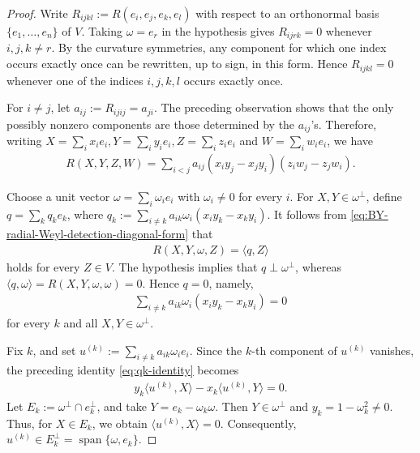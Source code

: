 \documentclass[10pt]{amsart}
\theoremstyle{plain}
\theoremstyle{remark}
\begin{document}
	\begin{proof}
		Write $R_{ijkl}:=R(e_i,e_j,e_k,e_l)$ with respect to an orthonormal
		basis $\{e_1,\ldots,e_n\}$ of $V$. Taking $\omega=e_r$ in the
		hypothesis gives $R_{ijrk}=0$ whenever $i,j,k\neq r$. By the curvature
		symmetries, any component for which one index occurs exactly once can
		be rewritten, up to sign, in this form. Hence $R_{ijkl}=0$ whenever
		one of the indices $i,j,k,l$ occurs exactly once.
		
		For $i\neq j$, let $a_{ij}:=R_{ijij}=a_{ji}$. The preceding observation
		shows that the only possibly nonzero components are those determined by
		the $a_{ij}$'s. Therefore, writing $X=\sum_i x_i e_i,Y=\sum_i y_i e_i,Z=\sum_i z_i e_i$ and $W=\sum_i w_i e_i$, we have
		\begin{align}
			\label{eq:BY-radial-Weyl-detection-diagonal-form}
			R(X,Y,Z,W)
			=
			\sum_{i<j}
			a_{ij}
			(x_i y_j-x_j y_i)
			(z_i w_j-z_j w_i).
		\end{align}
		
		Choose a unit vector $\omega=\sum_i\omega_i e_i$ with $\omega_i\neq0$
		for every $i$. For $X,Y\in\omega^\perp$, define
		$q=\sum_k q_k e_k$, where $q_k:=\sum_{i\neq k}a_{ik}\omega_i(x_i y_k-x_k y_i)$. It follows from
		\eqref{eq:BY-radial-Weyl-detection-diagonal-form} that
		\begin{align*}
			R(X,Y,\omega,Z)=\langle q,Z\rangle
		\end{align*}
		holds for every $Z\in V$. The hypothesis
		implies that $q\perp\omega^\perp$, whereas
		$\langle q,\omega\rangle=R(X,Y,\omega,\omega)=0$. Hence $q=0$, namely,
		\begin{align}\label{eq:qk-identity}
			\sum_{i\neq k}
			a_{ik}\omega_i
			(x_i y_k-x_k y_i)
			=
			0
		\end{align}
		for every $k$ and all $X,Y\in\omega^\perp$.
		
		Fix $k$, and set $u^{(k)}:=\sum_{i\neq k}a_{ik}\omega_i e_i$. Since the
		$k$-th component of $u^{(k)}$ vanishes, the preceding identity \eqref{eq:qk-identity} becomes
		\begin{align*}
			y_k\langle u^{(k)},X\rangle-x_k\langle u^{(k)},Y\rangle=0.
		\end{align*}
		Let
		$E_k:=\omega^\perp\cap e_k^\perp$, and take
		$Y=e_k-\omega_k\omega$. Then $Y\in\omega^\perp$ and
		$y_k=1-\omega_k^2\neq0$. Thus, for $X\in E_k$, we obtain
		$\langle u^{(k)},X\rangle=0$. Consequently,
		$u^{(k)}\in E_k^\perp=\operatorname{span}\{\omega,e_k\}$.
		

\end{proof}
\end{document}
